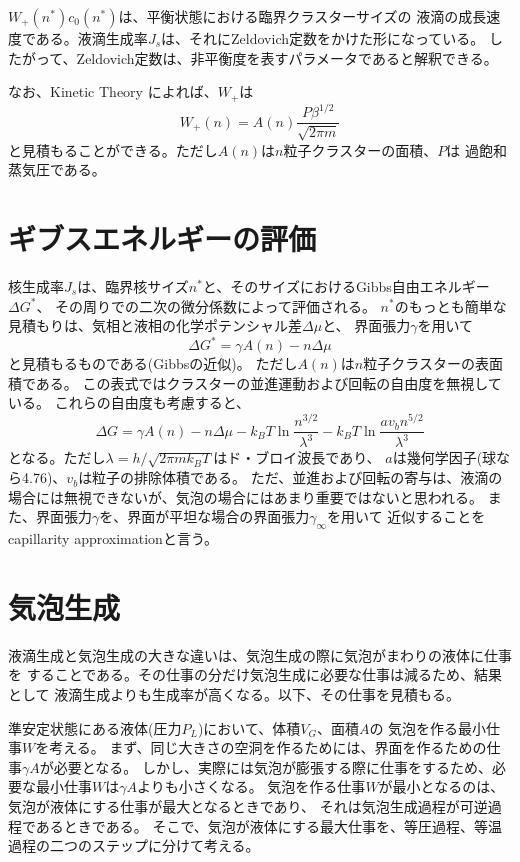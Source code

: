 \documentclass{jarticle}
\begin{document}
$W_+(n^*) c_0(n^*)$は、平衡状態における臨界クラスターサイズの
液滴の成長速度である。液滴生成率$J_s$は、それにZeldovich定数をかけた形になっている。
したがって、Zeldovich定数は、非平衡度を表すパラメータであると解釈できる。

なお、Kinetic Theory によれば、$W_+$は
\begin{equation}
    W_+(n) = A(n) \frac{P \beta^{1/2}}{\sqrt{2\pi m}}
\end{equation}
と見積もることができる。ただし$A(n)$は$n$粒子クラスターの面積、$P$は
過飽和蒸気圧である。

\section{ギブスエネルギーの評価}

核生成率$J_s$は、臨界核サイズ$n^*$と、そのサイズにおけるGibbs自由エネルギー$\Delta G^*$、
その周りでの二次の微分係数によって評価される。
$n^*$のもっとも簡単な見積もりは、気相と液相の化学ポテンシャル差$\Delta \mu$と、
界面張力$\gamma$を用いて
\begin{equation}
    \Delta G^* = \gamma A(n) - n \Delta \mu
\end{equation}
と見積もるものである(Gibbsの近似)。
ただし$A(n)$は$n$粒子クラスターの表面積である。
この表式ではクラスターの並進運動および回転の自由度を無視している。
これらの自由度も考慮すると、
\begin{equation}
    \Delta G = \gamma A(n) - n \Delta \mu -k_B T \ln \frac{n^{3/2}}{\lambda^3}
    - k_B T \ln \frac{a v_b n^{5/2}}{\lambda^3}
\end{equation}
となる。ただし$\lambda = h/\sqrt{2 \pi m k_B T}$はド・ブロイ波長であり、
$a$は幾何学因子(球なら4.76)、$v_b$は粒子の排除体積である。
ただ、並進および回転の寄与は、液滴の場合には無視できないが、気泡の場合にはあまり重要ではないと思われる。
また、界面張力$\gamma$を、界面が平坦な場合の界面張力$\gamma_\infty$を用いて
近似することをcapillarity approximationと言う。

\section{気泡生成}

液滴生成と気泡生成の大きな違いは、気泡生成の際に気泡がまわりの液体に仕事を
することである。その仕事の分だけ気泡生成に必要な仕事は減るため、結果として
液滴生成よりも生成率が高くなる。以下、その仕事を見積もる\cite{CNTBubble}。

準安定状態にある液体(圧力$P_L$)において、体積$V_G$、面積$A$の
気泡を作る最小仕事$W$を考える。
まず、同じ大きさの空洞を作るためには、界面を作るための仕事$\gamma A$が必要となる。
しかし、実際には気泡が膨張する際に仕事をするため、必要な最小仕事$W$は$\gamma A$よりも小さくなる。
気泡を作る仕事$W$が最小となるのは、気泡が液体にする仕事が最大となるときであり、
それは気泡生成過程が可逆過程であるときである。
そこで、気泡が液体にする最大仕事を、等圧過程、等温過程の二つのステップに分けて考える。
\end{document}
